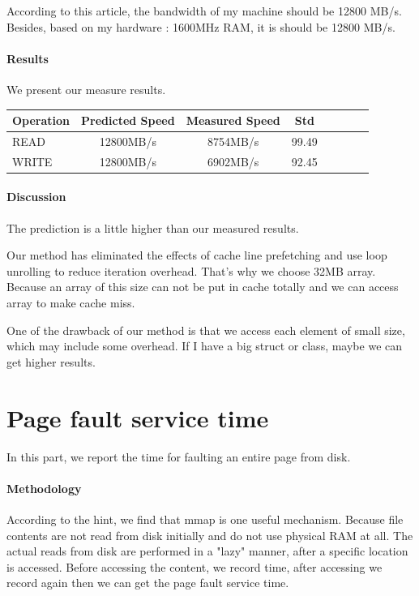 According to this article, the bandwidth of my machine should be 12800 MB/s. Besides, based on my hardware : 1600MHz RAM, it is should be 12800 MB/s.

\paragraph{Results}
We present our measure results.

\begin{center}
\begin{tabular}{l*{6}{c}r}
Operation             & Predicted Speed & Measured Speed & Std \\
\hline
READ & 12800MB/s & 8754MB/s & 99.49 \\
WRITE & 12800MB/s & 6902MB/s & 92.45\\

\end{tabular}
\end{center}

\paragraph{Discussion}
The prediction is a little higher than our measured results. 

Our method has eliminated the effects of cache line prefetching and use loop unrolling to reduce iteration overhead. That's why we choose 32MB array. Because an array of this size can not be put in cache totally and we can access array to make cache miss.

One of the drawback of our method is that we access each element of small size, which may include some overhead. If I have a big struct or class, maybe we can get higher results. 

\section{Page fault service time}
In this part, we report the time for faulting an entire page from disk.

\paragraph{Methodology}
According to the hint, we find that mmap is one useful mechanism. Because file contents are not read from disk initially and do not use physical RAM at all. The actual reads from disk are performed in a "lazy" manner, after a specific location is accessed. Before accessing the content, we record time, after accessing we record again then we can get the page fault service time.

